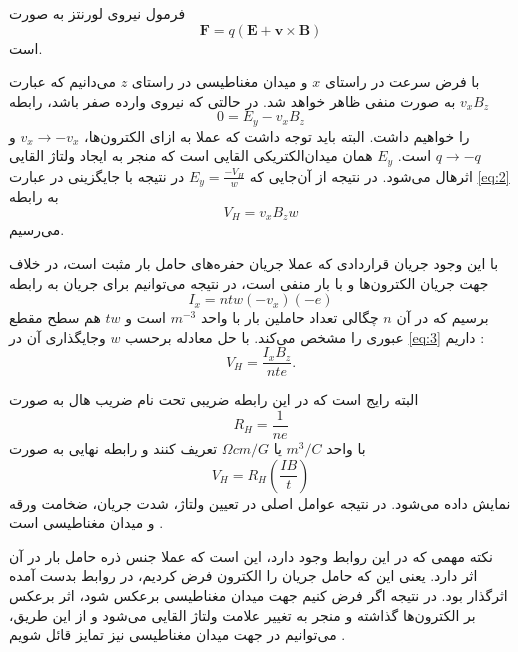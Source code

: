 فرمول نیروی لورنتز به صورت 
\begin{equation}
	\boldsymbol{F} = q(\boldsymbol{E} + \boldsymbol{v} \times \boldsymbol{B})
\end{equation}
است.
\cite{halliday2010fundamentals}

با فرض سرعت در راستای $x$ و میدان مغناطیسی در راستای $z$ می‌دانیم که عبارت $v_x B_z$ به صورت منفی ظاهر خواهد شد. در حالتی که نیروی وارده صفر باشد، رابطه
\begin{equation}
	0 = E_y - v_x B_z
	\label{eq:2}
\end{equation}
را خواهیم داشت. البته باید توجه داشت که عملا به ازای الکترون‌ها،
$v_x\rightarrow -v_x$
و
$q \rightarrow -q$
است. $E_y$ همان میدان‌‌الکتریکی القایی است که منجر به ایجاد ولتاژ القایی اثرهال می‌شود.  در نتیجه از آن‌جایی که
$E_y = \frac{-V_H}{w}$
در نتیجه با جایگزینی در عبارت \eqref{eq:2} به رابطه
\begin{equation}
	V_H = v_x B_z w
	\label{eq:3}
\end{equation}
می‌رسیم.

با این وجود جریان قراردادی که عملا جریان حفره‌های حامل بار مثبت است، در خلاف جهت جریان الکترون‌ها و با بار منفی است، در نتیجه می‌توانیم برای جریان به رابطه
\begin{equation}
	I_x = ntw(-v_x)(-e)
\end{equation}
برسیم که در آن $n$ چگالی تعداد حاملین بار با واحد $m^{-3}$ است و $tw$ هم سطح مقطع عبوری را مشخص می‌کند. با حل معادله برحسب $w$ وجایگذاری آن در
\eqref{eq:3}
داریم \cite{noauthor_hall_2021}:
\begin{equation}
	V_H = \frac{I_x B_z}{n t e}.
\end{equation}


البته رایج است که در این رابطه ضریبی تحت نام ضریب هال به صورت 
\begin{equation}
	R_H = \frac{1}{n e}
\end{equation}
با واحد $m^3/C$ یا $\Omega cm/G$ تعریف کنند و رابطه نهایی به صورت
\begin{equation}
	V_H = R_H (\frac{I B}{t})
	\label{eq:7}
\end{equation}
نمایش داده می‌شود. در نتیجه عوامل اصلی در تعیین ولتاژ، شدت جریان، ضخامت ورقه و میدان مغناطیسی است
\cite{ele_hall_2013}.

نکته مهمی که در این روابط وجود دارد، این است که عملا جنس ذره حامل بار در آن اثر دارد. یعنی این که حامل جریان را الکترون فرض کردیم، در روابط بدست آمده اثرگذار بود. در نتیجه اگر فرض کنیم جهت میدان مغناطیسی برعکس شود، اثر برعکس بر الکترون‌ها گذاشته و منجر به تغییر علامت ولتاژ القایی می‌شود و از این طریق، می‌توانیم در جهت میدان مغناطیسی نیز تمایز قائل شویم
\cite{noauthor_hall_2021}.

